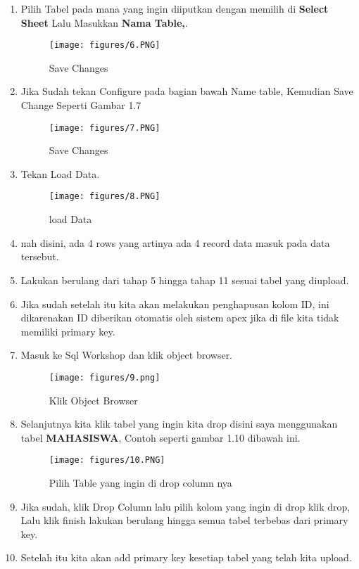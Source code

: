 \begin{enumerate}
\item Pilih Tabel pada mana yang ingin diiputkan dengan memilih di \textbf{Select Sheet} Lalu Masukkan \textbf{Nama Table,}.
\begin{figure}[!htbp]
\centering
\texttt{[image: figures/6.PNG]}
\caption{Save Changes}
\label{penanda}
\end{figure}
\item Jika Sudah tekan Configure pada bagian bawah Name table, Kemudian Save Change Seperti Gambar 1.7
\begin{figure}[!htbp]
\centering
\texttt{[image: figures/7.PNG]}
\caption{Save Changes}
\label{penanda}
\end{figure}
\item Tekan Load Data.
\begin{figure}[!htbp]
\centering
\texttt{[image: figures/8.PNG]}
\caption{load Data}
\label{penanda}
\end{figure} \vspace{6cm}
\item nah disini, ada 4 rows yang artinya ada 4 record data masuk pada data tersebut.
\item  Lakukan berulang dari tahap 5 hingga tahap 11 sesuai tabel yang diupload.
\item  Jika sudah setelah itu kita akan melakukan penghapusan kolom ID, ini dikarenakan ID diberikan otomatis oleh sistem apex jika di file kita tidak memiliki primary key.
\item Masuk ke Sql Workshop dan klik object browser.
\begin{figure}[!htbp]
\centering
\texttt{[image: figures/9.png]}
\caption{Klik Object Browser}
\label{penanda}
\end{figure}\vspace{6cm}
\item Selanjutnya kita klik tabel yang ingin kita drop disini saya menggunakan tabel \textbf{MAHASISWA}, Contoh seperti gambar 1.10 dibawah ini.
\begin{figure}[!htbp]
\centering
\texttt{[image: figures/10.PNG]}
\caption{Pilih Table yang ingin di drop column nya}
\label{penanda}
\end{figure}
\item Jika sudah, klik Drop Column lalu pilih kolom yang ingin di drop klik drop, Lalu klik finish lakukan berulang hingga semua tabel terbebas dari primary key.
\item Setelah itu kita akan add primary key kesetiap tabel yang telah kita upload.

\end{enumerate}
